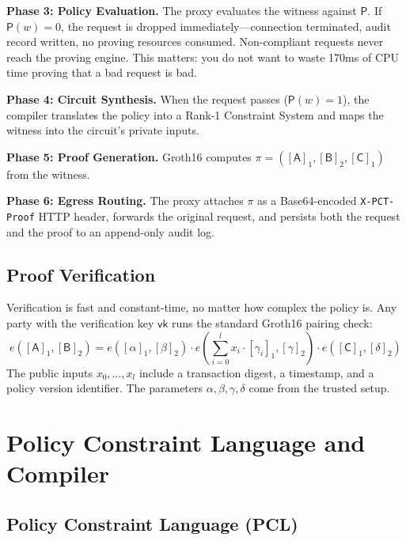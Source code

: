 \documentclass[10pt,conference]{IEEEtran}
\begin{document}
\textbf{Phase 3: Policy Evaluation.} The proxy evaluates the witness against $\mathsf{P}$. If $\mathsf{P}(w) = 0$, the request is dropped immediately---connection terminated, audit record written, no proving resources consumed. Non-compliant requests never reach the proving engine. This matters: you do not want to waste 170ms of CPU time proving that a bad request is bad.

\textbf{Phase 4: Circuit Synthesis.} When the request passes ($\mathsf{P}(w) = 1$), the compiler translates the policy into a Rank-1 Constraint System and maps the witness into the circuit's private inputs.

\textbf{Phase 5: Proof Generation.} Groth16 computes $\pi = ([\mathsf{A}]_1, [\mathsf{B}]_2, [\mathsf{C}]_1)$ from the witness.

\textbf{Phase 6: Egress Routing.} The proxy attaches $\pi$ as a Base64-encoded \texttt{X-PCT-Proof} HTTP header, forwards the original request, and persists both the request and the proof to an append-only audit log.

\subsection{Proof Verification}

Verification is fast and constant-time, no matter how complex the policy is. Any party with the verification key $\mathsf{vk}$ runs the standard Groth16 pairing check:
\begin{equation}
    e([\mathsf{A}]_1, [\mathsf{B}]_2) = e([\alpha]_1, [\beta]_2) \cdot e\left(\sum_{i=0}^{l} x_i \cdot [\gamma_i]_1, [\gamma]_2\right) \cdot e([\mathsf{C}]_1, [\delta]_2)
    \label{eq:pairing}
\end{equation}
The public inputs $x_0, \ldots, x_l$ include a transaction digest, a timestamp, and a policy version identifier. The parameters $\alpha, \beta, \gamma, \delta$ come from the trusted setup.

\section{Policy Constraint Language and Compiler}
\label{sec:compiler}

\subsection{Policy Constraint Language (PCL)}
\end{document}
